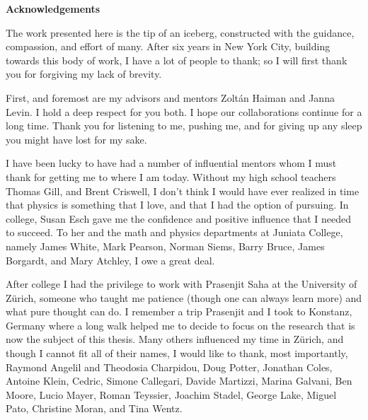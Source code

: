 \newpage

\begin{center}
    {\large \bf Acknowledgements }
\end{center}

\vspace{-0.2cm}


The work presented here is the tip of an iceberg, constructed with the
guidance, compassion, and effort of many. After six years in New York City,
building towards this body of work, I have a lot of people to thank; so
I will first thank you for forgiving my lack of brevity.


First, and foremost are my advisors and mentors Zolt\'an Haiman and Janna
Levin. I hold a deep respect for you both. I hope our collaborations continue
for a long time. Thank you for listening to me, pushing me, and for giving up
any sleep you might have lost for my sake.



I have been lucky to have had a number of influential mentors whom I must thank for
getting me to where I am today. Without my high school teachers Thomas Gill,
and Brent Criswell, I don't think I would have ever realized in time that
physics is something that I love, and that I had the option of pursuing. In
college, Susan Esch gave me the confidence and positive influence that I
needed to succeed. To her and the math and physics departments at Juniata
College, namely James White, Mark Pearson, Norman Siems,
Barry Bruce, James Borgardt, and Mary Atchley, I owe a great deal.


After college I had the privilege to work with Prasenjit Saha at the
University of Z\"urich, someone who taught me patience (though one can always
learn more) and what pure thought can do. I remember a trip Prasenjit and
I took to Konstanz, Germany where a long walk helped me to decide to focus on
the research that is now the subject of this thesis. Many others influenced my time
in Z\"urich, and though I cannot fit all of their names, I would like to
thank, most importantly, Raymond Angelil and Theodosia Charpidou, 
Doug Potter, Jonathan Coles,
Antoine Klein, Cedric, Simone Callegari, Davide Martizzi, Marina
Galvani, Ben Moore, Lucio Mayer, Roman Teyssier, Joachim
Stadel, George Lake, Miguel Pato, Christine Moran, and Tina Wentz.

